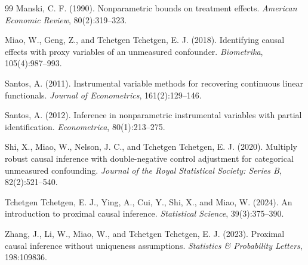 \documentclass[11pt]{article}
\theoremstyle{definition}
\theoremstyle{plain}
\theoremstyle{remark}
\begin{document}
\begin{thebibliography}{99}
Manski, C. F. (1990).
\newblock Nonparametric bounds on treatment effects.
\newblock \emph{American Economic Review}, 80(2):319--323.

Miao, W., Geng, Z., and Tchetgen Tchetgen, E. J. (2018).
\newblock Identifying causal effects with proxy variables of an unmeasured
confounder.
\newblock \emph{Biometrika}, 105(4):987--993.

Santos, A. (2011).
\newblock Instrumental variable methods for recovering continuous linear
functionals.
\newblock \emph{Journal of Econometrics}, 161(2):129--146.

Santos, A. (2012).
\newblock Inference in nonparametric instrumental variables with partial
identification.
\newblock \emph{Econometrica}, 80(1):213--275.

Shi, X., Miao, W., Nelson, J. C., and Tchetgen Tchetgen, E. J. (2020).
\newblock Multiply robust causal inference with double-negative control
adjustment for categorical unmeasured confounding.
\newblock \emph{Journal of the Royal Statistical Society: Series B},
82(2):521--540.

Tchetgen Tchetgen, E. J., Ying, A., Cui, Y., Shi, X., and Miao, W. (2024).
\newblock An introduction to proximal causal inference.
\newblock \emph{Statistical Science}, 39(3):375--390.

Zhang, J., Li, W., Miao, W., and Tchetgen Tchetgen, E. J. (2023).
\newblock Proximal causal inference without uniqueness assumptions.
\newblock \emph{Statistics \& Probability Letters}, 198:109836.
\end{thebibliography}
\end{document}
